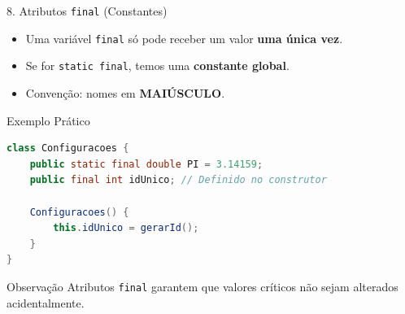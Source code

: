 \documentclass[9pt]{beamer}
\begin{document}
\begin{frame}[fragile]{8. Atributos \texttt{final} (Constantes)}

\begin{itemize}
    \item Uma variável \texttt{final} só pode receber um valor \textbf{uma única vez}.
    \item Se for \texttt{static final}, temos uma \textbf{constante global}.
    \item Convenção: nomes em \textbf{MAIÚSCULO}.
\end{itemize}

\vspace{0.3cm}

\begin{center}
\end{center}

\vspace{0.3cm}

\begin{block}{Exemplo Prático}
\begin{lstlisting}[language=Java]
class Configuracoes {
    public static final double PI = 3.14159;
    public final int idUnico; // Definido no construtor

    Configuracoes() {
        this.idUnico = gerarId();
    }
}
\end{lstlisting}
\end{block}

\vspace{0.3cm}

\begin{block}{Observação}
Atributos \texttt{final} garantem que valores críticos não sejam alterados acidentalmente.
\end{block}

\end{frame}
\end{document}
